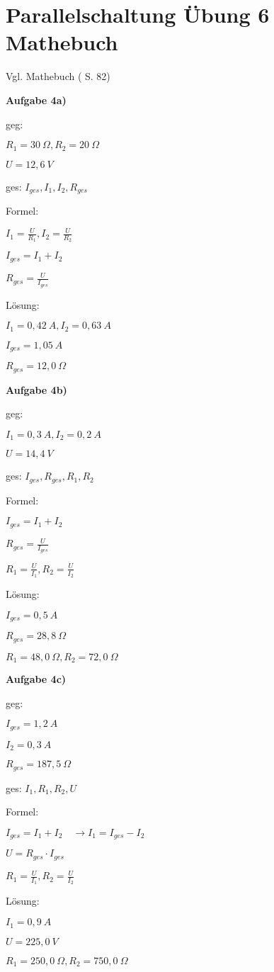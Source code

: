 \section{Parallelschaltung Übung 6
Mathebuch}\label{parallelschaltung-uebung-6-mathebuch}

Vgl. Mathebuch (\textcite{elbl:2016:technMa} S. 82)

\textbf{Aufgabe 4a)}

geg:

$R_1 = 30~\Omega, R_2 = 20~\Omega$

$U = 12,6~V$

ges: $I_{ges}, I_1, I_2, R_{ges}$

Formel:

$I_1 = \frac{U}{R_1}, I_2 = \frac{U}{R_2}$

$I_{ges} = I_1 + I_2$

$R_{ges} = \frac{U}{I_{ges}}$

Lösung:

$I_1 = 0,42~A, I_2 = 0,63~A$

$I_{ges} = 1,05~A$

$R_{ges} = 12,0~\Omega$

\textbf{Aufgabe 4b)}

geg:

$I_1 = 0,3~A, I_2 = 0,2~A$

$U = 14,4~V$

ges: $I_{ges}, R_{ges}, R_1, R_2$

Formel:

$I_{ges} = I_1 + I_2$

$R_{ges} = \frac{U}{I_{ges}}$

$R_1 = \frac{U}{I_1}, R_2 = \frac{U}{I_2}$

Lösung:

$I_{ges} = 0,5~A$

$R_{ges} = 28,8~\Omega$

$R_1 = 48,0~\Omega, R_2 = 72,0~\Omega$

\newpage

\textbf{Aufgabe 4c)}

geg:

$I_{ges} = 1,2~A$

$I_2 = 0,3~A$

$R_{ges} = 187,5~\Omega$

ges: $I_1, R_1, R_2, U$

Formel:

$I_{ges} = I_1 + I_2 \quad \to I_1 = I_{ges} - I_2$

$U = R_{ges} \cdot I_{ges}$

$R_1 = \frac{U}{I_1}, R_2 = \frac{U}{I_2}$

Lösung:

$I_1 = 0,9~A$

$U = 225,0~V$

$R_1 = 250,0~\Omega, R_2 = 750,0~\Omega$

